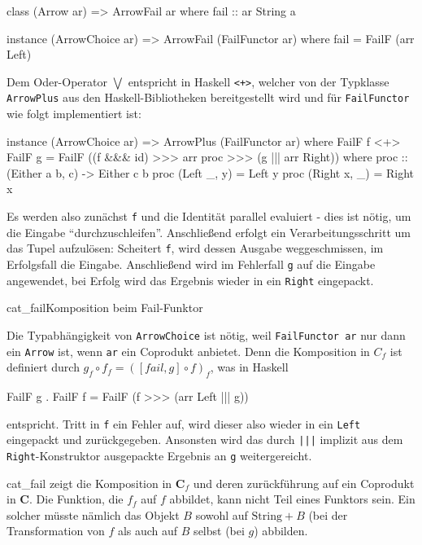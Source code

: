\documentclass[11pt, a4paper, bibgerm]{scrbook}
\newcommand\icode[1]{\lstinline?#1?}
\newcommand\abb{}
\newcommand\fig{}
\begin{document}
\begin{code}
class (Arrow ar) => ArrowFail ar where
  fail :: ar String a

instance (ArrowChoice ar) => ArrowFail (FailFunctor ar) where
  fail = FailF (arr Left)
\end{code}

Dem Oder-Operator $\bigvee$ entspricht in Haskell \icode{<+>}, welcher
von der Typklasse \icode{ArrowPlus} aus den Haskell-Bibliotheken
bereitgestellt wird und für \icode{FailFunctor} wie folgt implementiert
ist:

\begin{code}
instance (ArrowChoice ar) => ArrowPlus (FailFunctor ar) where
  FailF f <+> FailF g = FailF ((f &&& id) >>> arr proc >>> (g ||| arr Right))
   where proc :: (Either a b, c) -> Either c b
         proc (Left  _, y) = Left y
         proc (Right x, _) = Right x
\end{code} %

Es werden also zunächst \icode{f} und die Identität parallel evaluiert -
dies ist nötig, um die Eingabe "`durchzuschleifen"'. Anschließend
erfolgt ein Verarbeitungsschritt um das Tupel aufzulösen: Scheitert
\icode{f}, wird dessen Ausgabe weggeschmissen, im Erfolgsfall die
Eingabe. Anschließend wird im Fehlerfall \icode{g} auf die Eingabe
angewendet, bei Erfolg wird das Ergebnis wieder in ein \icode{Right} eingepackt.

\fig{cat_fail}{Komposition beim Fail-Funktor}

Die Typabhängigkeit von \icode{ArrowChoice} ist nötig, weil
\icode{FailFunctor ar} nur dann ein \icode{Arrow} ist, wenn \icode{ar}
ein Coprodukt anbietet. Denn die Komposition in $C_{f}$ ist definiert
durch $g_{f} \circ f_{f} = ([fail,g] \circ f)_{f}$, was in Haskell
\begin{code}
FailF g . FailF f = FailF (f >>> (arr Left ||| g))
\end{code} %
entspricht. Tritt in \icode{f} ein Fehler auf, wird dieser also wieder
in ein \icode{Left} eingepackt und zurückgegeben. Ansonsten wird das
durch \icode{|||} implizit aus dem \icode{Right}-Konstruktor ausgepackte
Ergebnis an \icode{g} weitergereicht.

\abb{cat_fail} zeigt die Komposition in $\mathbf{C}_f$ und deren
zurückführung auf ein Coprodukt in $\mathbf{C}$. Die Funktion, die $f_f$
auf $f$ abbildet, kann nicht Teil eines Funktors sein. Ein solcher
müsste nämlich das Objekt $B$ sowohl auf $\mathrm{String}+B$ (bei der
Transformation von $f$ als auch auf $B$ selbst (bei $g$) abbilden.
\end{document}
